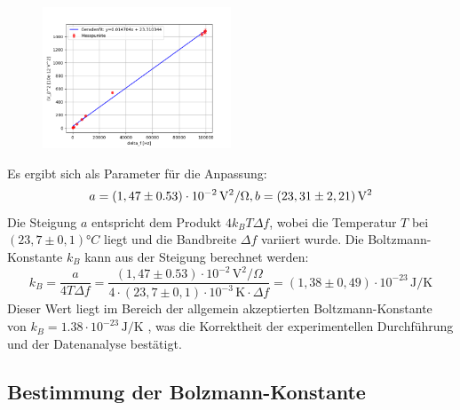 \begin{figure}[htbp]
    \centering
    \includegraphics[width=0.5\textwidth]{figs/johnson_bandwith.png}
    \caption{}
    \label{fig:fit2}
\end{figure}
\FloatBarrier
Es ergibt sich als Parameter für die Anpassung:
\begin{equation}
a = (1,47 \pm 0.53) \cdot 10^{-2} \, \mathrm{V}^2/\Omega,   \\
b = (23,31 \pm 2,21) \, \mathrm{V}^2
\end{equation}
Die Steigung $a$ entspricht dem Produkt $4 k_B T \Delta f$, wobei die Temperatur $T$ bei $(23,7 \pm 0,1) °C$ liegt und die Bandbreite $\Delta f$ variiert wurde. Die Boltzmann-Konstante $k_B$ kann aus der Steigung berechnet werden:
\begin{equation}
k_B = \frac{a}{4 T \Delta f} = \frac{(1,47 \pm 0.53) \cdot 10^{-2} \,\mathrm{V}^2/\Omega}{4 \cdot (23,7 \pm 0,1) \cdot 10^{-3} \,\mathrm{K} \cdot \Delta f} = (1,38 \pm 0,49) \cdot 10^{-23} \,\mathrm{J/K}
\end{equation}
Dieser Wert liegt im Bereich der allgemein akzeptierten Boltzmann-Konstante von $k_B = 1.38 \cdot 10^{-23} \,\mathrm{J/K}$ \cite{} %
, was die Korrektheit der experimentellen Durchführung und der Datenanalyse bestätigt.
\subsection{Bestimmung der Bolzmann-Konstante}
